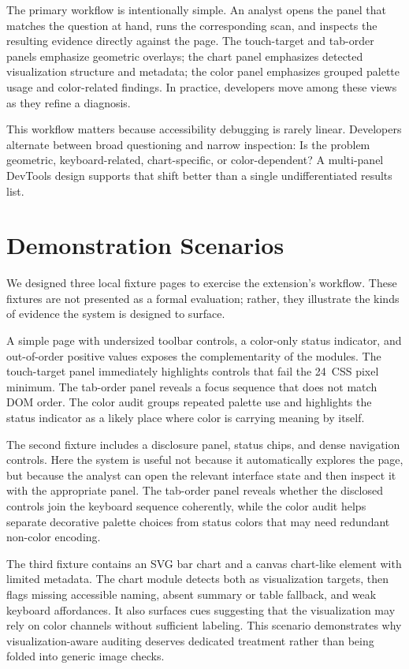 The primary workflow is intentionally simple. An analyst opens the panel that matches the question at hand, runs the corresponding scan, and inspects the resulting evidence directly against the page. The touch-target and tab-order panels emphasize geometric overlays; the chart panel emphasizes detected visualization structure and metadata; the color panel emphasizes grouped palette usage and color-related findings. In practice, developers move among these views as they refine a diagnosis.

This workflow matters because accessibility debugging is rarely linear. Developers alternate between broad questioning and narrow inspection: Is the problem geometric, keyboard-related, chart-specific, or color-dependent? A multi-panel DevTools design supports that shift better than a single undifferentiated results list.

\section{Demonstration Scenarios}
\label{sec:scenarios}

We designed three local fixture pages to exercise the extension's workflow. These fixtures are not presented as a formal evaluation; rather, they illustrate the kinds of evidence the system is designed to surface.

A simple page with undersized toolbar controls, a color-only status indicator, and out-of-order positive  values exposes the complementarity of the modules. The touch-target panel immediately highlights controls that fail the 24~CSS pixel minimum. The tab-order panel reveals a focus sequence that does not match DOM order. The color audit groups repeated palette use and highlights the status indicator as a likely place where color is carrying meaning by itself.

The second fixture includes a disclosure panel, status chips, and dense navigation controls. Here the system is useful not because it automatically explores the page, but because the analyst can open the relevant interface state and then inspect it with the appropriate panel. The tab-order panel reveals whether the disclosed controls join the keyboard sequence coherently, while the color audit helps separate decorative palette choices from status colors that may need redundant non-color encoding.

The third fixture contains an SVG bar chart and a canvas chart-like element with limited metadata. The chart module detects both as visualization targets, then flags missing accessible naming, absent summary or table fallback, and weak keyboard affordances. It also surfaces cues suggesting that the visualization may rely on color channels without sufficient labeling. This scenario demonstrates why visualization-aware auditing deserves dedicated treatment rather than being folded into generic image checks.

